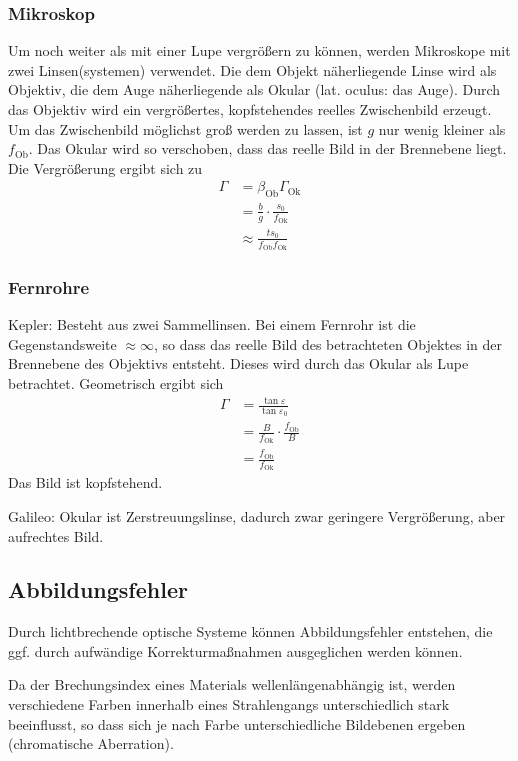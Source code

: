 \documentclass[a4paper]{scrartcl}
\begin{document}
\subsubsection{Mikroskop}
Um noch weiter als mit einer Lupe vergrößern zu können, werden Mikroskope mit zwei Linsen(systemen) verwendet. Die dem Objekt näherliegende Linse wird als Objektiv, die dem Auge näherliegende als Okular (lat. oculus: das Auge). Durch das Objektiv wird ein vergrößertes, kopfstehendes reelles Zwischenbild erzeugt. Um das Zwischenbild möglichst groß werden zu lassen, ist $g$ nur wenig kleiner als $f_\text{Ob}$. Das Okular wird so verschoben, dass das reelle Bild in der Brennebene liegt. Die Vergrößerung ergibt sich zu
\begin{align*}
  \Gamma &= \beta_\text{Ob}\Gamma_\text{Ok} \\
  & = \frac{b}{g} \cdot \frac{s_0}{f_\text{Ok}}\\
  & \approx \frac{ts_0}{f_\text{Ob}f_\text{Ok}}
\end{align*}

\subsubsection{Fernrohre}
Kepler: Besteht aus zwei Sammellinsen. Bei einem Fernrohr ist die Gegenstandsweite $\approx\infty$, so dass das reelle Bild des betrachteten Objektes in der Brennebene des Objektivs entsteht. Dieses wird durch das Okular als Lupe betrachtet. Geometrisch ergibt sich
\begin{align*}
  \Gamma &= \frac{\tan\varepsilon}{\tan\varepsilon_0} \\
   & = \frac{B}{f_\text{Ok}} \cdot \frac{f_\text{Ob}}{B}\\
   & = \frac{f_\text{Ob}}{f_\text{Ok}}
\end{align*}
Das Bild ist kopfstehend.

Galileo: Okular ist Zerstreuungslinse, dadurch zwar geringere Vergrößerung, aber aufrechtes Bild.

\subsection{Abbildungsfehler}
Durch lichtbrechende optische Systeme können Abbildungsfehler entstehen, die ggf. durch aufwändige Korrekturmaßnahmen ausgeglichen werden können.

Da der Brechungsindex eines Materials wellenlängenabhängig ist, werden verschiedene Farben innerhalb eines Strahlengangs unterschiedlich stark beeinflusst, so dass sich je nach Farbe unterschiedliche Bildebenen ergeben (chromatische Aberration).
\end{document}
